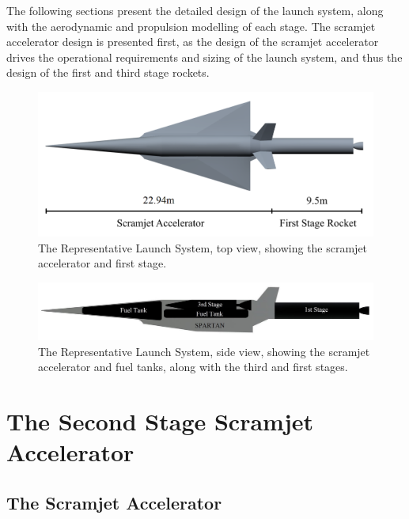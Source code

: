  The following sections present the detailed design of the launch system, along with the aerodynamic and propulsion modelling of each stage.
The scramjet accelerator design is presented first, as the design of the scramjet accelerator drives the operational requirements and sizing of the launch system, and thus the design of the first and third stage rockets. 


\begin{figure}[ht]
	\centering
	\includegraphics[width=0.85\linewidth]{figures/3_vehicle_design/NoInternal}
	\caption{The Representative Launch System, top view, showing the scramjet accelerator and first stage. }
	\label{fig:NoInternal}
\end{figure}

\begin{figure}[ht]
	\centering
	\includegraphics[width=0.85\linewidth]{figures/3_vehicle_design/INTERNALS}
	\caption{The Representative Launch System, side view, showing the scramjet accelerator and fuel tanks, along with the third and first stages. }
	\label{fig:INTERNALS}
\end{figure}









	
	
	\section{The Second Stage Scramjet Accelerator}\label{sec:SPARTAN}
		\subsection{The Scramjet Accelerator}
		
